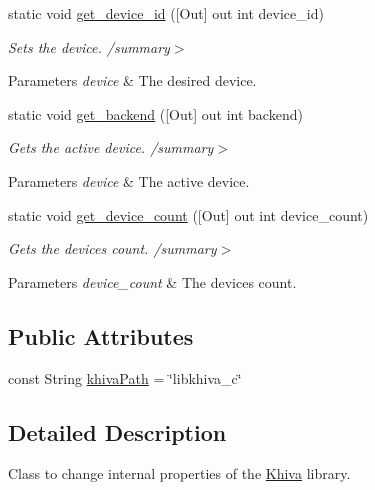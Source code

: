 \begin{DoxyCompactItemize}
static void \mbox{\hyperlink{classkhiva_1_1interop_1_1_d_l_l_library_ac02fd5c68ca77e632601922dad9ba635}{get\+\_\+device\+\_\+id}} (\mbox{[}Out\mbox{]} out int device\+\_\+id)
\begin{DoxyCompactList}\small\item\em Sets the device. /summary$>$ 
\begin{DoxyParams}{Parameters}
{\em device} & The desired device.\\
\hline
\end{DoxyParams}
\end{DoxyCompactList}\item 
static void \mbox{\hyperlink{classkhiva_1_1interop_1_1_d_l_l_library_ad98c4f20777e3b375befab351daaa948}{get\+\_\+backend}} (\mbox{[}Out\mbox{]} out int backend)
\begin{DoxyCompactList}\small\item\em Gets the active device. /summary$>$ 
\begin{DoxyParams}{Parameters}
{\em device} & The active device.\\
\hline
\end{DoxyParams}
\end{DoxyCompactList}\item 
static void \mbox{\hyperlink{classkhiva_1_1interop_1_1_d_l_l_library_a89897882221d9c471efa503eba37901a}{get\+\_\+device\+\_\+count}} (\mbox{[}Out\mbox{]} out int device\+\_\+count)
\begin{DoxyCompactList}\small\item\em Gets the devices count. /summary$>$ 
\begin{DoxyParams}{Parameters}
{\em device\+\_\+count} & The devices count.\\
\hline
\end{DoxyParams}
\end{DoxyCompactList}\end{DoxyCompactItemize}
\subsection*{Public Attributes}
\begin{DoxyCompactItemize}
\item 
const String \mbox{\hyperlink{classkhiva_1_1interop_1_1_d_l_l_library_ab866b901c6b9b3ba453be2e7e0720299}{khiva\+Path}} = \char`\"{}libkhiva\+\_\+c\char`\"{}
\end{DoxyCompactItemize}


\subsection{Detailed Description}
Class to change internal properties of the \mbox{\hyperlink{classkhiva_1_1_khiva}{Khiva}} library. 



